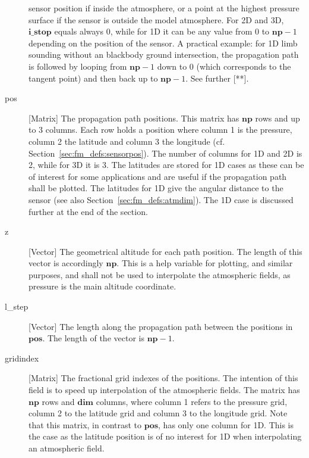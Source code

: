 \begin{description}
     sensor position if inside the atmosphere, or a point at the highest
     pressure surface if the sensor is outside the model atmosphere. 
     For 2D and 3D, $\mathbf{i\_stop}$ equals always 0, while for 1D it 
     can be any value from 0 to $\mathbf{np}-1$ depending on the position 
     of the sensor. A practical example: for 1D limb sounding without an
     blackbody ground intersection, the propagation path is followed by
     looping from $\mathbf{np}-1$ down to 0 (which corresponds to the tangent
     point) and then back up to $\mathbf{np}-1$. See further [**].
   \item[pos] [Matrix] The propagation path positions. This matrix has
     $\mathbf{np}$ rows and up to 3 columns. Each row holds a position
     where column 1 is the pressure, column 2 the latitude and column
     3 the longitude (cf. Section~\ref{sec:fm_defs:sensorpos}). The
     number of columns for 1D and 2D is 2, while for 3D it is 3. The
     latitudes are stored for 1D cases as these can be of interest for
     some applications and are useful if the propagation path shall be
     plotted. The latitudes for 1D give the angular distance to the
     sensor (see also Section~\ref{sec:fm_defs:atmdim}). The 1D case is 
     discussed further at the end of the section.
  \item[z] [Vector] The geometrical altitude for each path position. The
     length of this vector is accordingly $\mathbf{np}$. This is a help
     variable for plotting, and similar purposes, and shall not be used to
     interpolate the atmospheric fields, as pressure is the main altitude
     coordinate.
  \item[l\_step] [Vector] The length along the propagation path between
     the positions in $\mathbf{pos}$. The length of the vector is
     $\mathbf{np}-1$. 
  \item[gridindex] [Matrix] The fractional grid indexes of the positions.
     The intention of this field is to speed up interpolation of the 
     atmospheric fields. The matrix has $\mathbf{np}$ rows and $\mathbf{dim}$ 
     columns, where column 1 refers to the pressure grid, column 2 to the 
     latitude grid and column 3 to the longitude grid. Note that this matrix,
     in contrast to $\mathbf{pos}$, has only one column for 1D. This is the 
     case as the latitude position is of no interest for 1D when interpolating
     an atmospheric field. 


\end{description}
